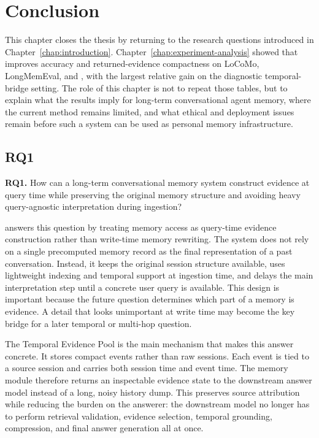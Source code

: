 \chapter{Conclusion}
\label{chap:conclusion}
\label{chap:discussion}

This chapter closes the thesis by returning to the research questions introduced
in Chapter~\ref{chap:introduction}. Chapter~\ref{chap:experiment-analysis}
showed that \sys{} improves accuracy and returned-evidence compactness on
LoCoMo, LongMemEval, and \bench{}, with the largest relative gain on the
diagnostic temporal-bridge setting. The role of this chapter is not to repeat
those tables, but to explain what the results imply for long-term conversational
agent memory, where the current method remains limited, and what ethical and
deployment issues remain before such a system can be used as personal memory
infrastructure.

\section{RQ1}
\label{sec:conclusion-rq1}

\textbf{RQ1.} How can a long-term conversational memory system construct
evidence at query time while preserving the original memory structure and
avoiding heavy query-agnostic interpretation during ingestion?

\sys{} answers this question by treating memory access as query-time evidence
construction rather than write-time memory rewriting. The system does not rely
on a single precomputed memory record as the final representation of a past
conversation. Instead, it keeps the original session structure available, uses
lightweight indexing and temporal support at ingestion time, and delays the
main interpretation step until a concrete user query is available. This design
is important because the future question determines which part of a memory is
evidence. A detail that looks unimportant at write time may become the key
bridge for a later temporal or multi-hop question.

The Temporal Evidence Pool is the main mechanism that makes this answer
concrete. It stores compact events rather than raw sessions. Each event is tied
to a source session and carries both session time and event time. The memory
module therefore returns an inspectable evidence state to the downstream answer
model instead of a long, noisy history dump. This preserves source attribution
while reducing the burden on the answerer: the downstream model no longer has
to perform retrieval validation, evidence selection, temporal grounding,
compression, and final answer generation all at once.

